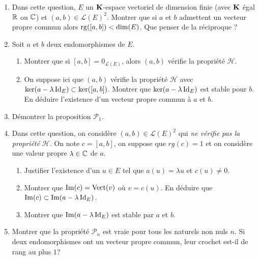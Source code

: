 \begin{enumerate}
 \item Dans cette question, $E$ un $\mathbf{K}$-espace vectoriel de dimension finie (avec $\mathbf{K}$ égal $\mathbb{R}$ ou $\mathbb{C}$) et $(a,b)\in\mathcal{L}(E)^2$. Montrer que si $a$ et $b$ admettent un vecteur propre commun alors $\operatorname{rg}([a,b])< \dim(E)$. Que penser de la réciproque ?
\item Soit $a$ et $b$ deux endomorphismes de $E$.
\begin{enumerate}
 \item Montrer que si $[a,b]=0_{\mathcal{L}(E)}$, alors $(a,b)$ vérifie la propriété $\mathcal{H}$.
 \item On suppose ici que $(a,b)$ vérifie la propriété $\mathcal{H}$ avec $\ker(a-\lambda \operatorname{Id}_E)\subset\ker([a,b])$. Montrer que $\ker(a-\lambda \operatorname{Id}_E)$ est stable pour $b$. En déduire l'existence d'un vecteur propre commun à $a$ et $b$.
\end{enumerate}

\item Démontrer la proposition $\mathcal{P}_1$.

\item Dans cette question, on considère $(a,b)\in \mathcal{L}(E)^2$ qui \emph{ne vérifie pas la propriété} $\mathcal{H}$.\newline
On note $c=[a,b]$, on suppose que $rg(c)=1$ et on considère une valeur propre $\lambda\in \mathbb{C}$ de $a$.
\begin{enumerate}
 \item Justifier l'existence d'un $u\in E$ tel que $a(u)=\lambda u$ et $c(u)\neq 0$.
 \item Montrer que $\operatorname{Im}(c) = \operatorname{Vect}(v)$ où $v=c(u)$. En déduire que $\operatorname{Im}(c)\subset \operatorname{Im}(a-\lambda \operatorname{Id}_E)$.
 \item Montrer que $\operatorname{Im}(a-\lambda \operatorname{Id}_E)$ est stable par $a$ et $b$.
\end{enumerate}

 \item Montrer que la propriété $\mathcal{P}_n$ est vraie pour tous les naturels non nuls $n$.\newline
 Si deux endomorphismes ont un vecteur propre commun, leur crochet est-il de rang au plus $1$?
\end{enumerate}

